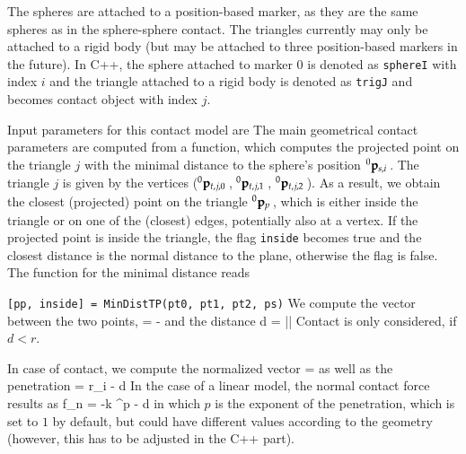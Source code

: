 The spheres are attached to a position-based marker, as they are the same spheres as in the sphere-sphere contact.
The triangles currently may only be attached to a rigid body (but may be attached to three position-based markers in the future).
%
In C++, the sphere attached to marker 0 is denoted as \texttt{sphereI} with index $i$ and the triangle attached to a rigid body is denoted as \texttt{trigJ} and becomes contact object with index $j$.

Input parameters for this contact model are
\finishTable
\vspace{6pt}
The main geometrical contact parameters are computed from a function, which computes the projected point on the triangle $j$ with the minimal distance to the sphere's position $\prescript{0}{}{\mathbf{p}_{s,i}}\,$. The triangle $j$ is given by the vertices ($\prescript{0}{}{\mathbf{p}_{t,j,0}}\,$, $\prescript{0}{}{\mathbf{p}_{t,j,1}}\,$, $\prescript{0}{}{\mathbf{p}_{t,j,2}}\,$).
As a result, we obtain the closest (projected) point on the triangle $\prescript{0}{}{\mathbf{p}_{p}}\,$, which is either inside the triangle or on one of the (closest) edges, potentially also at a vertex. If the projected point is inside the triangle, the flag \texttt{inside} becomes true and the closest distance is the normal distance to the plane, otherwise the flag is false.
The function for the minimal distance reads
\bi
  \item[] \texttt{[pp, inside] = MinDistTP(pt0, pt1, pt2, ps)}
\ei
We compute the vector between the two points,
\be
   =  - 
\ee
and the distance 
\be
  d = ||
\ee
Contact is only considered, if $d < r$.

In case of contact, we compute the normalized vector
\be
   =  
\ee
as well as the penetration
\be
  \Delta = r_i - d
\ee
In the case of a linear model, the normal contact force results as
\be
  f_n = -k \cdot \Delta^p - d \cdot \dot \Delta
\ee
in which $p$ is the exponent of the penetration, which is set to $1$ by default, but could have different values according to the geometry (however, this has to be adjusted in the C++ part).

